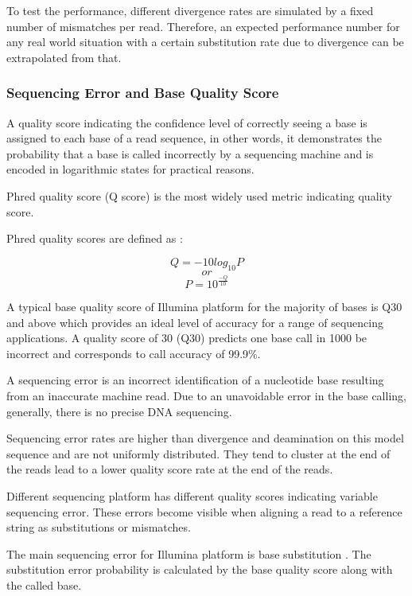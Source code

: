 \documentclass[11pt,a4paper]{report}
\begin{document}
To test the performance, different divergence rates are simulated by 
a fixed number of mismatches per read. Therefore, an expected performance 
number for any real world situation with a certain substitution rate due to 
divergence can be extrapolated from that.
 
 

\subsubsection{Sequencing Error and Base Quality Score} 
\label{Sequencing Error and Base Quality Score}
 

A quality score indicating the confidence level of correctly seeing a 
base is assigned to each base of a read sequence, in other words, it 
demonstrates the probability that a base is called incorrectly by a 
sequencing machine and is encoded in logarithmic states for practical 
reasons.

Phred quality score (Q score) is the most widely used metric
indicating quality score.


Phred quality scores are defined as \cite{phred2}:

$$ Q = -10  log_{10}P   $$
$$  or $$
$$ P = 10 ^ { \frac{-Q}{ 10 } } $$


A typical base quality score of Illumina platform for the majority of 
bases is Q30 and above which provides an ideal level of accuracy for a 
range of sequencing applications. 
A quality score of 30 (Q30) predicts one base call in 1000 be incorrect
and corresponds to call accuracy of 99.9\%.

A sequencing error is an incorrect identification of a nucleotide base 
resulting from an inaccurate machine read. Due to an unavoidable error 
in the base calling, generally, there is no precise DNA sequencing. 

Sequencing error rates are higher than divergence and deamination
on this model sequence and are not uniformly distributed. They tend to 
cluster at the end of the reads lead to a lower quality score rate at 
the end of the reads.

Different sequencing platform has different quality scores indicating 
variable sequencing error. These errors become visible when aligning a 
read to a reference string as substitutions or mismatches.

The main sequencing error for Illumina platform is base substitution 
\cite{art}. The substitution error probability is calculated by the 
base quality score along with the called base.
\end{document}
